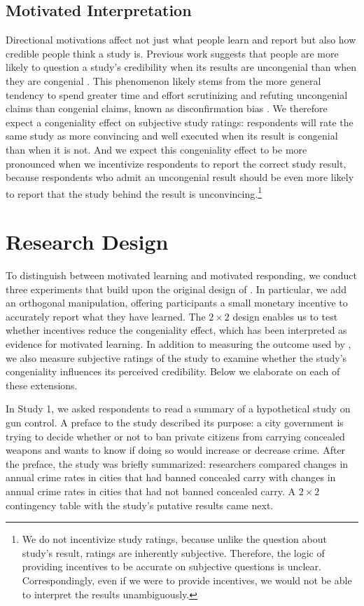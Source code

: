 \documentclass[12pt,letterpaper]{article}
\begin{document}
\subsection*{Motivated Interpretation}
Directional motivations affect not just what people learn and report but also how credible people think a study is. Previous work suggests that people are more likely to question a study's credibility when its results are uncongenial than when they are congenial \citep[e.g.,][]{lord1979, kunda1990, ditto1992}. This phenomenon likely stems from the more general tendency to spend greater time and effort scrutinizing and refuting uncongenial claims than congenial claims, known as disconfirmation bias \citep[e.g.,][]{edwards1996, taber2006}. We therefore expect a congeniality effect on subjective study ratings: respondents will rate the same study as more convincing and well executed when its result is congenial than when it is not. And we expect this congeniality effect to be more pronounced when we incentivize respondents to report the correct study result, because respondents who admit an uncongenial result should be even more likely to report that the study behind the result is unconvincing.\footnote{We do not incentivize study ratings, because unlike the question about study's result, ratings are inherently subjective. Therefore, the logic of providing incentives to be accurate on subjective questions is unclear. Correspondingly, even if we were to provide incentives, we would not be able to interpret the results unambiguously.} 

\section*{Research Design}

To distinguish between motivated learning and motivated responding, we conduct three experiments that build upon the original design of \citet{kahan2017}. In particular, we add an orthogonal manipulation, offering participants a small monetary incentive to accurately report what they have learned. The $2 \times 2$ design enables us to test whether incentives reduce the congeniality effect, which has been interpreted as evidence for motivated learning. In addition to measuring the outcome used by \citeauthor{kahan2017}, we also measure subjective ratings of the study to examine whether the study's congeniality influences its perceived credibility. Below we elaborate on each of these extensions.

In Study 1, we asked respondents to read a summary of a hypothetical study on gun control. A preface to the study described its purpose: a city government is trying to decide whether or not to ban private citizens from carrying concealed weapons and wants to know if doing so would increase or decrease crime. After the preface, the study was briefly summarized: researchers compared changes in annual crime rates in cities that had banned concealed carry with changes in annual crime rates in cities that had not banned concealed carry. A $2 \times 2$ contingency table with the study's putative results came next.
\end{document}
